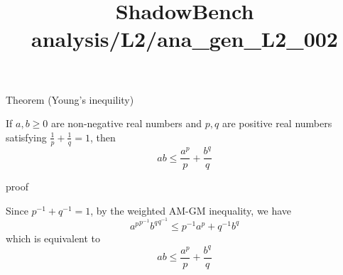 \documentclass{article}
\title{ShadowBench analysis/L2/ana\_gen\_L2\_002}
\begin{document}
\maketitle

Theorem (Young's inequility)

If $a,b \ge 0$ are non-negative real numbers and $p,q$ are positive real numbers satisfying $\frac{1}{p} + \frac{1}{q} = 1$, then
$$ ab \le \frac{a^p}{p} + \frac{b^q}{q}$$

proof

Since $p^{-1} + q^{-1} = 1$, by the weighted AM-GM inequality, we have
$$ {a^p}^{p^{-1}}{b^q}^{q^{-1}} \le p^{-1}a^p + q^{-1} b^q$$
which is equivalent to
$$ ab \le \frac{a^p}{p} + \frac{b^q}{q}$$
\end{document}
